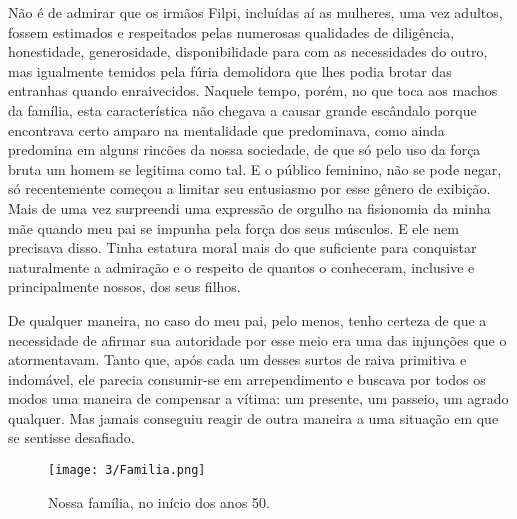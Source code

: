 Não é de admirar que os irmãos Filpi, incluídas aí as mulheres, uma vez adultos, fossem estimados e respeitados pelas numerosas qualidades de diligência, honestidade, generosidade, disponibilidade para com as necessidades do outro, mas igualmente temidos pela fúria demolidora que lhes podia brotar das entranhas quando enraivecidos.  
Naquele tempo, porém, no que toca aos machos da família, esta característica não chegava a causar grande escândalo porque encontrava certo amparo na mentalidade que predominava, como ainda predomina em alguns rincões da nossa sociedade, de que só pelo uso da força bruta um homem se legitima como tal. 
E o público feminino, não se pode negar, só recentemente começou a limitar seu entusiasmo por esse gênero de exibição. 
Mais de uma vez surpreendi uma expressão de orgulho na fisionomia da minha mãe quando meu pai se impunha pela força dos seus músculos. 
E ele nem precisava disso. 
Tinha estatura moral mais do que suficiente para conquistar naturalmente a admiração e o respeito de quantos o conheceram, inclusive e principalmente nossos, dos seus filhos. 

De qualquer maneira, no caso do meu pai, pelo menos, tenho certeza de que a necessidade de afirmar sua autoridade por esse meio era uma das injunções que o atormentavam. 
Tanto que, após cada um desses surtos de raiva primitiva e indomável, ele parecia consumir-se em arrependimento e buscava por todos os modos uma maneira de compensar a vítima: um presente, um passeio, um agrado qualquer. 
Mas jamais conseguiu reagir de outra maneira a uma situação em que se sentisse desafiado.

\begin{figure}[H]
\centering
\texttt{[image: 3/Familia.png]}
\caption{Nossa família, no início dos anos 50.}
\end{figure}

